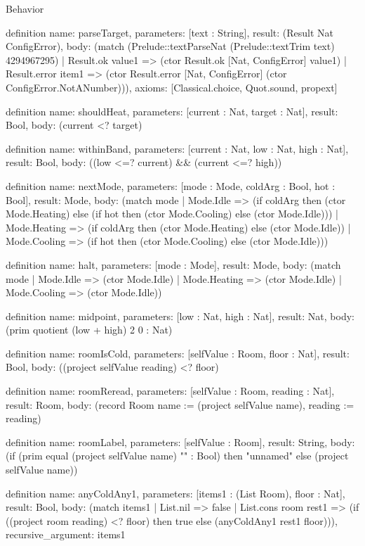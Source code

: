 \begin{lexlean}{Behavior}
\begin{semanticmodule}
definition{
  name: parseTarget,
  parameters: [text : String],
  result: (Result Nat ConfigError),
  body: (match (Prelude::textParseNat (Prelude::textTrim text) 4294967295)
    | Result.ok value1 => (ctor Result.ok [Nat, ConfigError] value1)
    | Result.error item1 => (ctor Result.error [Nat, ConfigError] (ctor ConfigError.NotANumber))),
  axioms: [Classical.choice, Quot.sound, propext]
}

definition{
  name: shouldHeat,
  parameters: [current : Nat, target : Nat],
  result: Bool,
  body: (current <? target)
}

definition{
  name: withinBand,
  parameters: [current : Nat, low : Nat, high : Nat],
  result: Bool,
  body: ((low <=? current) && (current <=? high))
}

definition{
  name: nextMode,
  parameters: [mode : Mode, coldArg : Bool, hot : Bool],
  result: Mode,
  body: (match mode
    | Mode.Idle => (if coldArg then (ctor Mode.Heating) else (if hot then (ctor Mode.Cooling) else (ctor Mode.Idle)))
    | Mode.Heating => (if coldArg then (ctor Mode.Heating) else (ctor Mode.Idle))
    | Mode.Cooling => (if hot then (ctor Mode.Cooling) else (ctor Mode.Idle)))
}

definition{
  name: halt,
  parameters: [mode : Mode],
  result: Mode,
  body: (match mode
    | Mode.Idle => (ctor Mode.Idle)
    | Mode.Heating => (ctor Mode.Idle)
    | Mode.Cooling => (ctor Mode.Idle))
}

definition{
  name: midpoint,
  parameters: [low : Nat, high : Nat],
  result: Nat,
  body: (prim quotient (low + high) 2 0 : Nat)
}

definition{
  name: roomIsCold,
  parameters: [selfValue : Room, floor : Nat],
  result: Bool,
  body: ((project selfValue reading) <? floor)
}

definition{
  name: roomReread,
  parameters: [selfValue : Room, reading : Nat],
  result: Room,
  body: (record Room {name := (project selfValue name), reading := reading})
}

definition{
  name: roomLabel,
  parameters: [selfValue : Room],
  result: String,
  body: (if (prim equal (project selfValue name) "" : Bool) then "unnamed" else (project selfValue name))
}

definition{
  name: anyColdAny1,
  parameters: [items1 : (List Room), floor : Nat],
  result: Bool,
  body: (match items1
    | List.nil => false
    | List.cons room rest1 => (if ((project room reading) <? floor) then true else (anyColdAny1 rest1 floor))),
  recursive_argument: items1
}


\end{semanticmodule}
\end{lexlean}
